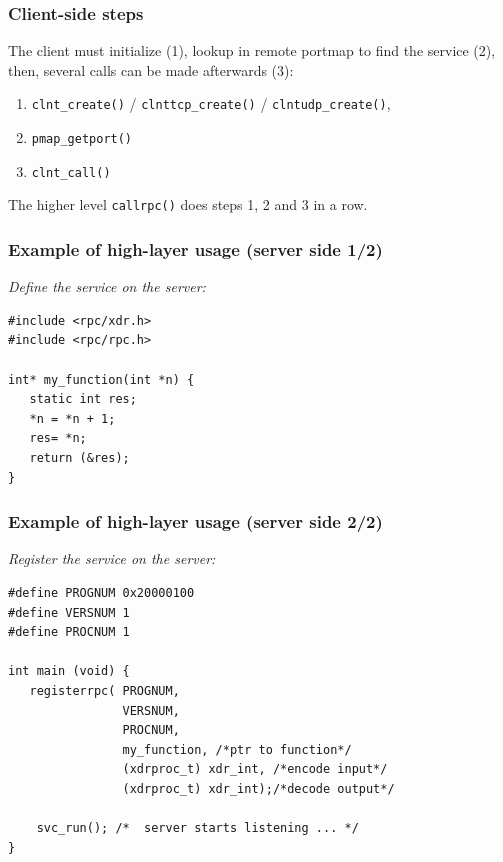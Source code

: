 \documentclass[bigger,hyperref={colorlinks=true, urlcolor=red, plainpages=false, pdfpagelabels, bookmarksnumbered}]{beamer}
\begin{document}
\begin{frame}
\frametitle{Client-side steps}
\label{sec-2-10}

   The client must initialize (1), lookup in remote portmap to find the service (2),
   then, several calls can be made afterwards (3):
\begin{enumerate}
\item \texttt{clnt\_create()} / \texttt{clnttcp\_create()} / \texttt{clntudp\_create()},
\item \texttt{pmap\_getport()}
\item \texttt{clnt\_call()}
\end{enumerate}

   The higher level \texttt{callrpc()} does steps 1, 2 and 3 in a row.
\end{frame}
\begin{frame}[fragile]
\frametitle{Example of high-layer usage (server side 1/2)}
\label{sec-2-11}

\emph{Define the service on the server:}

\lstset{language=C}
\begin{lstlisting}
#include <rpc/xdr.h>
#include <rpc/rpc.h>

int* my_function(int *n) {
   static int res;
   *n = *n + 1;
   res= *n; 
   return (&res);
}
\end{lstlisting}
 
\end{frame}
\begin{frame}[fragile]
\frametitle{Example of high-layer usage (server side 2/2)}
\label{sec-2-12}

\emph{Register the service on the server:}

\lstset{language=C}
\begin{lstlisting}
#define PROGNUM 0x20000100                                                      
#define VERSNUM 1                                                               
#define PROCNUM 1

int main (void) {
   registerrpc( PROGNUM,
                VERSNUM,
                PROCNUM,
                my_function, /*ptr to function*/
                (xdrproc_t) xdr_int, /*encode input*/
                (xdrproc_t) xdr_int);/*decode output*/

    svc_run(); /*  server starts listening ... */
}
\end{lstlisting}
\end{frame}
\end{document}
